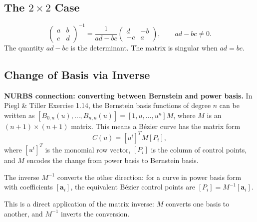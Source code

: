 \subsection*{\texorpdfstring{The $2 \times 2$ Case}{The 2 x 2 Case}}

\begin{tcolorbox}[colback=gray!6, colframe=gray!40, arc=2pt,
  left=6pt, right=6pt, top=4pt, bottom=4pt,
  title={\small\textbf{Formula ($2 \times 2$ Inverse)}},
  fonttitle=\small\bfseries]
\[
  \begin{pmatrix} a & b \\ c & d \end{pmatrix}^{-1}
  = \frac{1}{ad - bc} \begin{pmatrix} d & -b \\ -c & a \end{pmatrix},
  \qquad ad - bc \neq 0.
\]
The quantity $ad - bc$ is the determinant. The matrix is singular when $ad = bc$.
\end{tcolorbox}

\subsection*{Change of Basis via Inverse}

\begin{remark*}[Exposition]
\textbf{NURBS connection: converting between Bernstein and power basis.}
In Piegl \& Tiller Exercise 1.14, the Bernstein basis functions of degree $n$
can be written as $[B_{0,n}(u), \ldots, B_{n,n}(u)] = [1, u, \ldots, u^n] M$,
where $M$ is an $(n+1) \times (n+1)$ matrix.
This means a B\'{e}zier curve has the matrix form
\[
  C(u) = [u^i]^T M [P_i],
\]
where $[u^i]^T$ is the monomial row vector, $[P_i]$ is the column of control points,
and $M$ encodes the change from power basis to Bernstein basis.

The inverse $M^{-1}$ converts the other direction: for a curve in
power basis form with coefficients $[\mathbf{a}_i]$, the equivalent
B\'{e}zier control points are $[P_i] = M^{-1}[\mathbf{a}_i]$.

This is a direct application of the matrix inverse: $M$ converts one basis
to another, and $M^{-1}$ inverts the conversion.
\end{remark*}
